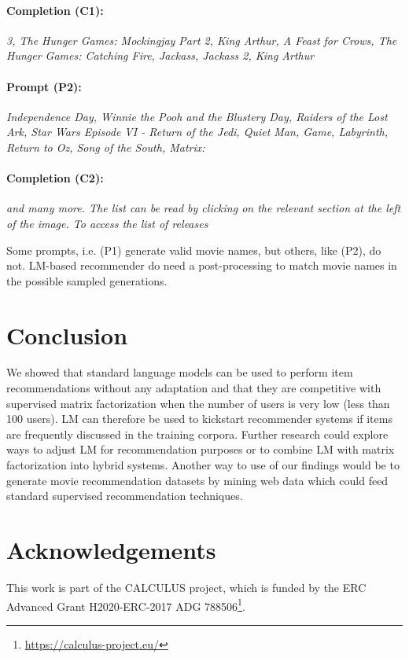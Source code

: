 \documentclass[runningheads]{llncs}
\begin{document}
\paragraph{\textbf{Completion (C1):}}
\textit{3, The Hunger Games: Mockingjay Part 2, King Arthur, A Feast for Crows, The Hunger Games: Catching Fire, Jackass, Jackass 2, King Arthur}

\paragraph{\textbf{Prompt (P2):}}
\textit{Independence Day, Winnie the Pooh and the Blustery Day, Raiders of the Lost Ark, Star Wars Episode VI - Return of the Jedi, Quiet Man, Game, Labyrinth, Return to Oz, Song of the South, Matrix:}
\vspace{-.3cm}
\paragraph{\textbf{Completion (C2):}}
\textit{and many more. The list can be read by clicking on the relevant section at the left of the image. To access the list of releases}\\
 \vspace{-0.1cm}

Some prompts, i.e. (P1) generate valid movie names, but others, like (P2), do not. LM-based recommender do need a post-processing to match movie names in the possible sampled generations.



\section{Conclusion}
We showed that standard language models can be used to perform item recommendations without any adaptation and that they are competitive with supervised matrix factorization  when the number of users is very low (less than 100 users). LM can therefore be used to kickstart recommender systems if items are frequently discussed in the training corpora.
Further research could explore ways to adjust LM for recommendation purposes or to combine LM with matrix factorization into hybrid systems.
Another way to use of our findings would be to generate movie recommendation datasets by mining web data which could feed standard supervised recommendation techniques.

\section{Acknowledgements}
This work is part of the CALCULUS project, which is
funded by the ERC Advanced Grant H2020-ERC-2017­
ADG 788506\footnote{\url{https://calculus-project.eu/}}. 
\end{document}

